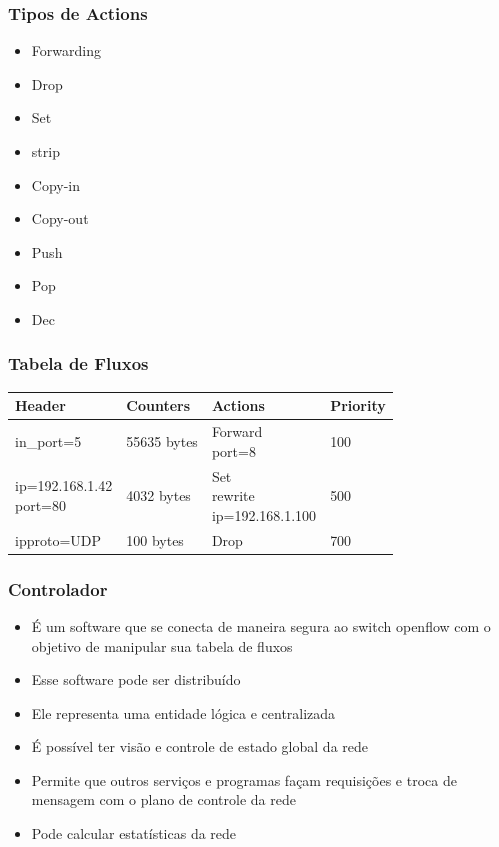 %
%
\begin{frame}\frametitle{Tipos de Actions}

    \begin{itemize}
    \item Forwarding
    \item Drop
    \item Set
    \item strip
    \item Copy-in
    \item Copy-out
    \item Push
    \item Pop
    \item Dec
    \end{itemize}

\end{frame}


%
%
\begin{frame}\frametitle{Tabela de Fluxos}

\begin{center}
    \begin{tabular}{ | l | l | l | l |}
    \hline
    \textbf{Header} & \textbf{Counters} & \textbf{Actions} & \textbf{Priority} \\ \hline
    in\_port=5 & 55635 bytes & \pbox{20cm}{Forward \\ port=8} & 100 \\ \hline
    \pbox{20cm}{ip=192.168.1.42 \\ port=80} & 4032 bytes & \pbox{30cm}{Set \\ rewrite \\ ip=192.168.1.100} & 500 \\ \hline
    ipproto=UDP & 100 bytes & Drop & 700 \\ \hline
    \end{tabular}
\end{center}

\end{frame}

%
%
\begin{frame}\frametitle{Controlador}

    \begin{itemize}
    \item É um software que se conecta de maneira segura ao switch openflow
          com o objetivo de manipular sua tabela de fluxos
    \item Esse software pode ser distribuído
    \item Ele representa uma entidade lógica e centralizada
    \item É possível ter visão e controle de estado global da rede
    \item Permite que outros serviços e programas façam requisições e troca
          de mensagem com o plano de controle da rede
    \item Pode calcular estatísticas da rede
    
    \end{itemize}

\end{frame}


